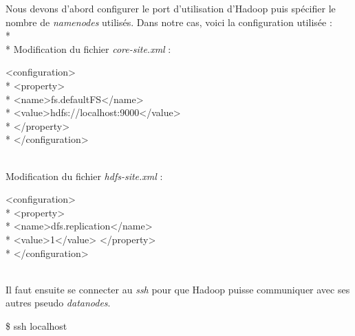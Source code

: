 \documentclass{article}
\begin{document}
Nous devons d'abord configurer le port d'utilisation d'Hadoop puis sp\'{e}cifier le nombre de \textit{namenodes} utilis\'{e}s. Dans notre cas, voici la configuration utilis\'{e}e : \\* \\*
Modification du fichier \textit{core-site.xml} :

\begin{tcolorbox}
\textless configuration\textgreater \\*
\tabto{1cm} \textless property\textgreater \\*
\tabto{2cm} \textless name\textgreater fs.defaultFS\textless /name\textgreater \\*
\tabto{2cm} \textless value\textgreater hdfs://localhost:9000\textless /value\textgreater \\*
\tabto{1cm} \textless /property\textgreater \\*
\textless /configuration\textgreater
\end{tcolorbox}
~\\
Modification du fichier \textit{hdfs-site.xml} :

\begin{tcolorbox}
\textless configuration\textgreater \\*
\tabto{1cm} \textless property\textgreater \\*
\tabto{2cm} \textless name\textgreater dfs.replication\textless /name\textgreater \\*
\tabto{2cm} \textless value\textgreater 1\textless /value\textgreater 
\tabto{1cm} \textless /property\textgreater \\*
\textless /configuration\textgreater
\end{tcolorbox}
~\\
Il faut ensuite se connecter au \textit{ssh} pour que Hadoop puisse communiquer avec ses autres pseudo \textit{datanodes}.

\begin{tcolorbox}
\$ ssh localhost
\end{tcolorbox}


\end{document}
